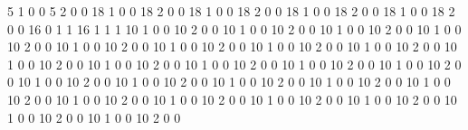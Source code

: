 5
1
0
0
5
2
0
0
18
1
0
0
18
2
0
0
18
1
0
0
18
2
0
0
18
1
0
0
18
2
0
0
18
1
0
0
18
2
0
0
16
0
1
1
16
1
1
1
10
1
0
0
10
2
0
0
10
1
0
0
10
2
0
0
10
1
0
0
10
2
0
0
10
1
0
0
10
2
0
0
10
1
0
0
10
2
0
0
10
1
0
0
10
2
0
0
10
1
0
0
10
2
0
0
10
1
0
0
10
2
0
0
10
1
0
0
10
2
0
0
10
1
0
0
10
2
0
0
10
1
0
0
10
2
0
0
10
1
0
0
10
2
0
0
10
1
0
0
10
2
0
0
10
1
0
0
10
2
0
0
10
1
0
0
10
2
0
0
10
1
0
0
10
2
0
0
10
1
0
0
10
2
0
0
10
1
0
0
10
2
0
0
10
1
0
0
10
2
0
0
10
1
0
0
10
2
0
0
10
1
0
0
10
2
0
0
10
1
0
0
10
2
0
0
10
1
0
0
10
2
0
0
10
1
0
0
10
2
0
0
